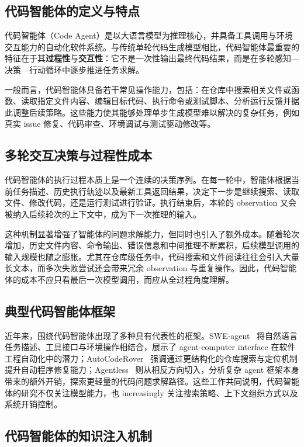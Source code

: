 \subsection{代码智能体的定义与特点}

代码智能体（Code Agent）是以大语言模型为推理核心，并具备工具调用与环境交互能力的自动化软件系统。与传统单轮代码生成模型相比，代码智能体最重要的特征在于其\textbf{过程性}与\textbf{交互性}：它不是一次性输出最终代码结果，而是在多轮感知—决策—行动循环中逐步推进任务求解。

一般而言，代码智能体具备若干常见操作能力，包括：在仓库中搜索相关文件或函数、读取指定文件内容、编辑目标代码、执行命令或测试脚本、分析运行反馈并据此调整后续策略。这些能力使其能够处理单步生成模型难以解决的复杂任务，例如真实 issue 修复、代码审查、环境调试与测试驱动修改等。

\subsection{多轮交互决策与过程性成本}

代码智能体的执行过程本质上是一个连续的决策序列。在每一轮中，智能体根据当前任务描述、历史执行轨迹以及最新工具返回结果，决定下一步是继续搜索、读取文件、修改代码，还是运行测试进行验证。执行结束后，本轮的 observation 又会被纳入后续轮次的上下文中，成为下一次推理的输入。

这种机制显著增强了智能体的问题求解能力，但同时也引入了额外成本。随着轮次增加，历史文件内容、命令输出、错误信息和中间推理不断累积，后续模型调用的输入规模也随之膨胀。尤其在仓库级任务中，代码搜索和文件阅读往往会引入大量长文本，而多次失败尝试还会带来冗余 observation 与重复操作。因此，代码智能体的成本不应只看最后一次模型调用，而应从全过程角度理解。

\subsection{典型代码智能体框架}

近年来，围绕代码智能体出现了多种具有代表性的框架。SWE-agent~\cite{yang2024sweagent} 将自然语言任务描述、工具接口与环境操作相结合，展示了 agent-computer interface 在软件工程自动化中的潜力；AutoCodeRover~\cite{zhang2024autocoderover} 强调通过更结构化的仓库搜索与定位机制提升自动程序修复能力；Agentless~\cite{xia2024agentless} 则从相反方向切入，分析复杂 agent 框架本身带来的额外开销，探索更轻量的代码问题求解路径。这些工作共同说明，代码智能体的研究不仅关注模型能力，也 increasingly 关注搜索策略、上下文组织方式以及系统开销控制。

\subsection{代码智能体的知识注入机制}
\label{subsec:agent-knowledge-injection}

